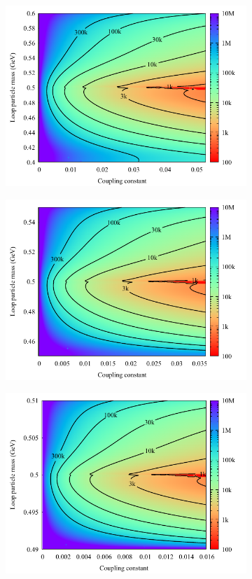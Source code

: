 \documentclass[10pt]{article}
\theoremstyle{definition}
\theoremstyle{remark}
\begin{document}
\begin{figure}[h]
\begin{subfigure}{0.3\textwidth}
			\includegraphics[width=\textwidth]{unbinned_0.1GeV.pdf}
			\caption{}
		\end{subfigure}
		\begin{subfigure}{0.3\textwidth}
		\centering
		\includegraphics[width=\textwidth]{unbinned_0.05GeV.pdf}
		\caption{}
		\end{subfigure}
		\begin{subfigure}{0.3\textwidth}
		\centering
		\includegraphics[width=\textwidth]{unbinned_0.01GeV.pdf}

\end{subfigure}
\end{figure}
\end{document}
